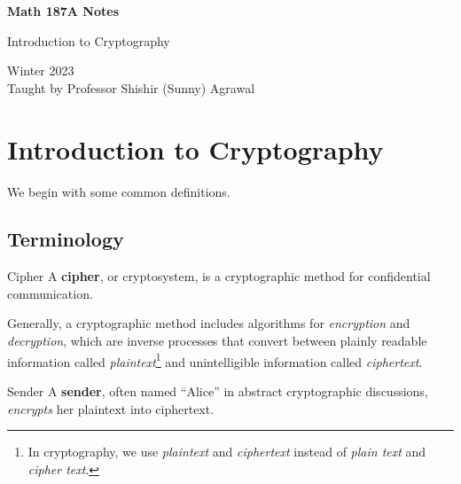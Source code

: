 \documentclass[letterpaper]{article}
\begin{document}
\begin{titlepage}
    \begin{center}
        \vspace*{1cm}
            
        \Huge
        \textbf{Math 187A Notes}
            
        \vspace{0.5cm}
        \LARGE
        Introduction to Cryptography
            
        \vspace{1.5cm}
            
        \vfill
            
        Winter 2023\\
        Taught by Professor Shishir (Sunny) Agrawal
    \end{center}
\end{titlepage}


\newpage 

\begingroup
    \renewcommand\contentsname{Table of Contents}
    \tableofcontents
\endgroup

\newpage
{}

\section{Introduction to Cryptography}
We begin with some common definitions.

\subsection{Terminology}
\begin{definition}{Cipher}{}
    A \textbf{cipher}, or cryptosystem, is a cryptographic method for confidential communication. 
\end{definition}
Generally, a cryptographic method includes algorithms for \emph{encryption} and \emph{decryption}, which are inverse processes that convert between plainly readable information called \emph{plaintext}\footnote{In cryptography, we use \emph{plaintext} and \emph{ciphertext} instead of \emph{plain text} and \emph{cipher text}.} and unintelligible information called \emph{ciphertext}.

\begin{definition}{Sender}{}
    A \textbf{sender}, often named ``Alice'' in abstract cryptographic discussions, \emph{encrypts} her plaintext into ciphertext. 
\end{definition}
\end{document}
